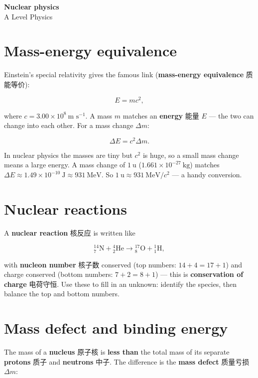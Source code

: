 \documentclass[11pt]{article}
\begin{document}
\begin{center}
  {\LARGE\bfseries Nuclear physics}\\[0.35em]
  {\large A Level Physics}
\end{center}
\vspace{0.6em}

\section*{Mass-energy equivalence}

Einstein's special relativity gives the famous link (\textbf{mass-energy equivalence} 质能等价):

\[
E = m c^{2},
\]

where $c = 3.00 \times 10^{8}\ \text{m s}^{-1}$. A mass $m$ matches an \textbf{energy} 能量 $E$ — the two can change into each other. For a mass change $\Delta m$:

\[
\Delta E = c^{2} \Delta m.
\]

In nuclear physics the masses are tiny but $c^{2}$ is huge, so a small mass change means a large energy. A mass change of $1\ \text{u}$ ($1.661 \times 10^{-27}\ \text{kg}$) matches $\Delta E \approx 1.49 \times 10^{-10}\ \text{J} \approx 931\ \text{MeV}$. So $1\ \text{u} \approx 931\ \text{MeV}/c^{2}$ — a handy conversion.

\section*{Nuclear reactions}

A \textbf{nuclear reaction} 核反应 is written like

\[
^{14}_{7}\text{N} + {}^{4}_{2}\text{He} \to {}^{17}_{8}\text{O} + {}^{1}_{1}\text{H},
\]

with \textbf{nucleon number} 核子数 conserved (top numbers: $14 + 4 = 17 + 1$) and charge conserved (bottom numbers: $7 + 2 = 8 + 1$) — this is \textbf{conservation of charge} 电荷守恒. Use these to fill in an unknown: identify the species, then balance the top and bottom numbers.

\section*{Mass defect and binding energy}

The mass of a \textbf{nucleus} 原子核 is \textbf{less than} the total mass of its separate \textbf{protons} 质子 and \textbf{neutrons} 中子. The difference is the \textbf{mass defect} 质量亏损 $\Delta m$:
\end{document}
